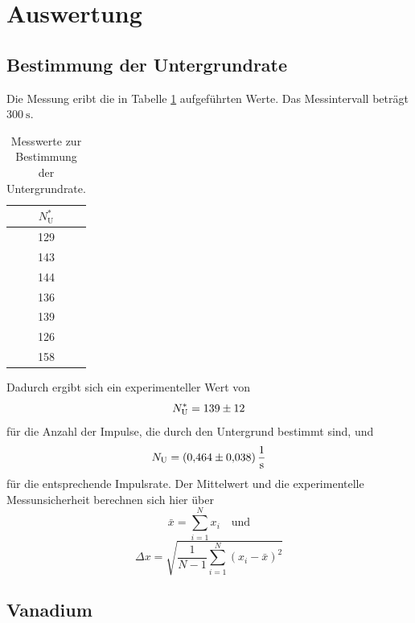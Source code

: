 \section{Auswertung}
\label{sec:Auswertung}

\subsection{Bestimmung der Untergrundrate}

Die Messung eribt die in Tabelle \ref{tab:Untergrundrate} aufgeführten Werte. Das Messintervall beträgt $\SI{300}{\second}$. 
\begin{table}
    \centering
    \caption{Messwerte zur Bestimmung der Untergrundrate.}
    \label{tab:Untergrundrate}
    \begin{tabular}{c}
        \toprule
        $N^*_\text{U}$ \\
        \midrule
        129 \\
        143 \\
        144 \\
        136 \\
        139 \\ 
        126 \\
        158 \\
        \bottomrule
    \end{tabular}
\end{table}
Dadurch ergibt sich ein experimenteller Wert von 
\begin{equation*}
    N^*_\text{U}=\num{139+-12}
\end{equation*}
für die Anzahl der Impulse, die durch den Untergrund bestimmt sind, und 
\begin{equation}
    N_\text{U}=\SI{0.464+-0.038}{\per\second}
    \label{eqn:Untergrund}
\end{equation}
für die entsprechende Impulsrate.
Der Mittelwert und die experimentelle Messunsicherheit berechnen sich hier über 
\begin{equation*}
    \bar{x}=\sum_{i=1}^N x_i \quad \text{und}
\end{equation*}
\begin{equation*}
    \Delta x = \sqrt{\frac{1}{N-1} \sum_{i=1}^N (x_i-\bar{x})^2}
\end{equation*}

\subsection{Vanadium}

